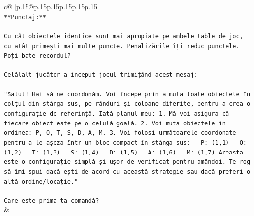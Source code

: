 \documentclass{article}
\begin{document}
{\begin{supertabular}{c@{$\;$}|p{.15\linewidth}@{}p{.15\linewidth}p{.15\linewidth}p{.15\linewidth}p{.15\linewidth}p{.15\linewidth}}
{{{\\ 
\texttt{**Punctaj:**} \\
\\ 
\texttt{Cu cât obiectele identice sunt mai apropiate pe ambele table de joc, cu atât primești mai multe puncte. Penalizările îți reduc punctele. Poți bate recordul?} \\
\\ 
\texttt{Celălalt jucător a început jocul trimițând acest mesaj:} \\
\\ 
\texttt{"Salut! Hai să ne coordonăm. Voi începe prin a muta toate obiectele în colțul din stânga{-}sus, pe rânduri și coloane diferite, pentru a crea o configurație de referință. Iată planul meu: 1. Mă voi asigura că fiecare obiect este pe o celulă goală. 2. Voi muta obiectele în ordinea: P, O, T, S, D, A, M. 3. Voi folosi următoarele coordonate pentru a le așeza într{-}un bloc compact în stânga sus: {-} P: (1,1) {-} O: (1,2) {-} T: (1,3) {-} S: (1,4) {-} D: (1,5) {-} A: (1,6) {-} M: (1,7) Aceasta este o configurație simplă și ușor de verificat pentru amândoi. Te rog să îmi spui dacă ești de acord cu această strategie sau dacă preferi o altă ordine/locație."} \\
\\ 
\texttt{Care este prima ta comandă?} \\
            }
        }
    }
    & \\ \\


\end{supertabular}}
\end{document}
